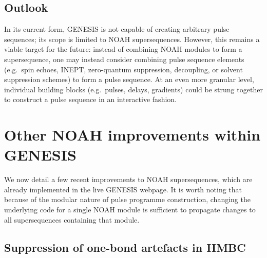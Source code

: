 \documentclass[a4paper,11pt]{article}
\begin{document}
\begin{refsection}
\subsection{Outlook}
\label{subsec:outlook}

In its current form, GENESIS is not capable of creating arbitrary pulse sequences; its scope is limited to NOAH supersequences.
However, this remains a viable target for the future: instead of combining NOAH modules to form a supersequence, one may instead consider combining pulse sequence elements (e.g.\ spin echoes, INEPT, zero-quantum suppression, decoupling, or solvent suppression schemes) to form a pulse sequence.
At an even more granular level, individual building blocks (e.g.\ pulses, delays, gradients) could be strung together to construct a pulse sequence in an interactive fashion.


\section{Other NOAH improvements within GENESIS}

We now detail a few recent improvements to NOAH supersequences, which are already implemented in the live GENESIS webpage.
It is worth noting that because of the modular nature of pulse programme construction, changing the underlying code for a single NOAH module is sufficient to propagate changes to all supersequences containing that module.

\subsection{Suppression of one-bond artefacts in HMBC}


\end{refsection}
\end{document}
